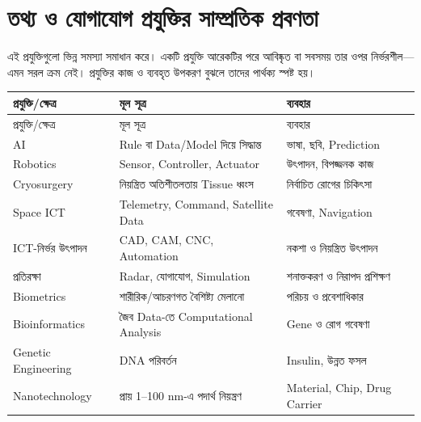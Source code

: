 \section{তথ্য ও যোগাযোগ প্রযুক্তির সাম্প্রতিক প্রবণতা}

এই প্রযুক্তিগুলো ভিন্ন সমস্যা সমাধান করে। একটি প্রযুক্তি আরেকটির পরে আবিষ্কৃত বা সবসময় তার ওপর নির্ভরশীল—এমন সরল ক্রম নেই। প্রযুক্তির কাজ ও ব্যবহৃত উপকরণ বুঝলে তাদের পার্থক্য স্পষ্ট হয়।
\begin{longtable}{|p{.25\linewidth}|p{.39\linewidth}|p{.28\linewidth}|}
\hline প্রযুক্তি/ক্ষেত্র & মূল সূত্র & ব্যবহার \\\hline\endfirsthead
\hline প্রযুক্তি/ক্ষেত্র & মূল সূত্র & ব্যবহার \\\hline\endhead
AI & Rule বা Data/Model দিয়ে সিদ্ধান্ত & ভাষা, ছবি, Prediction \\\hline
Robotics & Sensor, Controller, Actuator & উৎপাদন, বিপজ্জনক কাজ \\\hline
Cryosurgery & নিয়ন্ত্রিত অতিশীতলতায় Tissue ধ্বংস & নির্বাচিত রোগের চিকিৎসা \\\hline
Space ICT & Telemetry, Command, Satellite Data & গবেষণা, Navigation \\\hline
ICT-নির্ভর উৎপাদন & CAD, CAM, CNC, Automation & নকশা ও নিয়ন্ত্রিত উৎপাদন \\\hline
প্রতিরক্ষা & Radar, যোগাযোগ, Simulation & শনাক্তকরণ ও নিরাপদ প্রশিক্ষণ \\\hline
Biometrics & শারীরিক/আচরণগত বৈশিষ্ট্য মেলানো & পরিচয় ও প্রবেশাধিকার \\\hline
Bioinformatics & জৈব Data-তে Computational Analysis & Gene ও রোগ গবেষণা \\\hline
Genetic Engineering & DNA পরিবর্তন & Insulin, উন্নত ফসল \\\hline
Nanotechnology & প্রায় 1--100 nm-এ পদার্থ নিয়ন্ত্রণ & Material, Chip, Drug Carrier \\\hline
\end{longtable}












